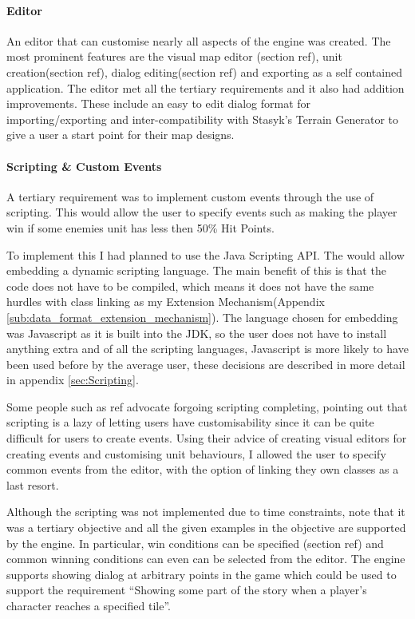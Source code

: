 \paragraph{Editor\\}
An editor that can customise nearly all aspects of the engine was created.  The most prominent features are the visual map editor (section ref), unit creation(section ref), dialog editing(section ref) and exporting as a self contained application.  The editor met all the  tertiary requirements and it also had addition improvements. These include an easy to edit dialog format for importing/exporting and inter-compatibility  with Stasyk’s Terrain Generator to give a user a start point for their map designs.


\paragraph{Scripting \& Custom Events\\}
A tertiary requirement was to implement custom events through the use of scripting.  This would allow the user to specify events such as making the player win if some enemies unit has less then 50\% Hit Points. 

To implement this I had planned to use the Java Scripting API\cite{javas}. The would allow embedding a dynamic scripting language.  The main benefit of this is that the code does not have to be compiled, which means it does not have the same hurdles with class linking as my Extension Mechanism(Appendix \ref{sub:data_format_extension_mechanism}).   The language chosen for embedding was Javascript  as it is built into the JDK, so the user does not have to install anything extra and of all the scripting languages, Javascript  is more likely to have been used before by the average user, these decisions are described in more detail in appendix \ref{sec:Scripting}. 

Some people such as ref  advocate forgoing scripting completing, pointing out that scripting is a lazy of letting users have customisability since it can be quite difficult for users to create events.  Using their advice of creating visual editors for creating events and customising unit behaviours, I allowed the user to specify common events from the editor, with the option of linking they own classes as a last resort. 

Although the scripting was not implemented due to time constraints, note that it was a tertiary objective and all the given examples in the objective are supported by the engine. In particular, win conditions can be specified (section ref) and common winning conditions can even can be selected from the editor.  The engine supports showing dialog at arbitrary points in the game which could be used to support the requirement ``Showing some part of the story when a player’s character reaches a specified tile''.

